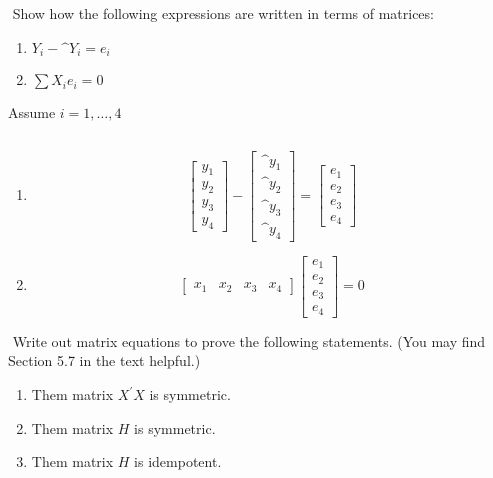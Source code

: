 \documentclass[10pt]{article}
\newenvironment{problem}[2][Problem]{\begin{trivlist}
\item[\hskip \labelsep {\bfseries #1}\hskip \labelsep {\bfseries #2.}]}{\end{trivlist}}
\newenvironment{answer}[2][Answer]{\begin{trivlist}
\item[\hskip \labelsep {\bfseries #1}\hskip \labelsep {\bfseries #2.}]}{\end{trivlist}}
\begin{document}
\begin{problem}{5}
$ $\newline
Show how the following expressions are written in terms of matrices:
\begin{enumerate}
    \item $Y_{i}-\^Y_{i} = e_{i}$
    \item $\sum X_{i}e_{i} = 0$
\end{enumerate}
Assume $i = 1,\dots,4$
\end{problem}

\begin{answer}{5}
$ $\newline
\begin{enumerate}
    \item \[
\begin{bmatrix}
    y_{1} \\
    y_{2} \\
    y_{3} \\
    y_{4}
\end{bmatrix}
-
\begin{bmatrix}
   \^y_{1} \\
   \^y_{2} \\
   \^y_{3} \\
   \^y_{4}
\end{bmatrix}
=
\begin{bmatrix}
    e_{1} \\
    e_{2} \\
    e_{3} \\
    e_{4}
\end{bmatrix}
\]
\item \[
\begin{bmatrix}
    x_{1} &
    x_{2} &
    x_{3} &
    x_{4}
\end{bmatrix}
\begin{bmatrix}
    e_{1} \\
    e_{2} \\
    e_{3} \\
    e_{4}
\end{bmatrix}
=
0
\]
\end{enumerate}
\end{answer}

\begin{problem}{6}
$ $\newline
Write out matrix equations to prove the following statements. (You may find Section 5.7 in the text helpful.)
\begin{enumerate}
    \item Them matrix $X^{'}X$ is symmetric.
    \item Them matrix $H$ is symmetric.
    \item Them matrix $H$ is idempotent.
\end{enumerate}
\end{problem}
\end{document}
